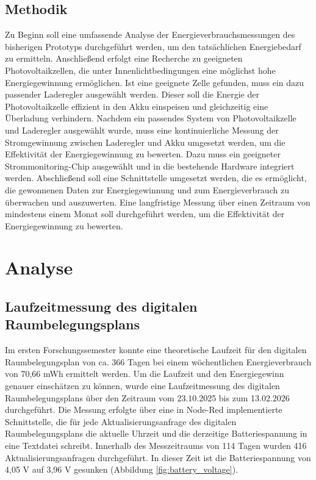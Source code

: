 \documentclass{article}
\begin{document}
\subsection{Methodik}
Zu Beginn soll eine umfassende Analyse der Energieverbrauchsmessungen des bisherigen Prototyps durchgeführt werden, um den tatsächlichen 
Energiebedarf zu ermitteln. Anschließend erfolgt eine Recherche zu geeigneten Photovoltaikzellen, die unter Innenlichtbedingungen eine 
möglichst hohe Energiegewinnung ermöglichen. Ist eine geeignete Zelle gefunden, muss ein dazu passender Laderegler ausgewählt werden. 
Dieser soll die Energie der Photovoltaikzelle effizient in den Akku einspeisen und gleichzeitig eine Überladung verhindern. Nachdem ein passendes 
System von Photovoltaikzelle und Laderegler ausgewählt wurde, muss eine kontinuierliche Messung der Stromgewinnung zwischen Laderegler und Akku umgesetzt 
werden, um die Effektivität der Energiegewinnung zu bewerten. Dazu muss ein geeigneter Strommonitoring-Chip ausgewählt und in die bestehende 
Hardware integriert werden. Abschließend soll eine Schnittstelle umgesetzt werden, die es ermöglicht, die gewonnenen Daten zur Energiegewinnung und zum 
Energieverbrauch zu überwachen und auszuwerten. Eine langfristige Messung über einen Zeitraum von mindestens einem Monat soll durchgeführt werden, um 
die Effektivität der Energiegewinnung zu bewerten.

\section{Analyse}

\subsection{Laufzeitmessung des digitalen Raumbelegungsplans}\label{sec:laufzeitmessung}
Im ersten Forschungssemester konnte eine theoretische Laufzeit für den digitalen Raumbelegungsplan von ca. 366 Tagen bei einem wöchentlichen 
Energieverbrauch von 70,66 mWh ermittelt werden. 
Um die Laufzeit und den Energiegewinn genauer einschätzen zu können, wurde eine Laufzeitmessung des digitalen Raumbelegungsplans über 
den Zeitraum vom 23.10.2025 bis zum 13.02.2026 durchgeführt. Die Messung erfolgte über eine 
in Node-Red implementierte Schnittstelle, die für jede Aktualisierungsanfrage des digitalen Raumbelegungsplans die aktuelle Uhrzeit und die derzeitige Batteriespannung 
in eine Textdatei schreibt. Innerhalb des Messzeitraums von 114 Tagen wurden 416 Aktualisierungsanfragen durchgeführt. In dieser Zeit ist die Batteriespannung 
von 4,05 V auf 3,96 V gesunken (Abbildung \ref{fig:battery_voltage}). 
\end{document}
